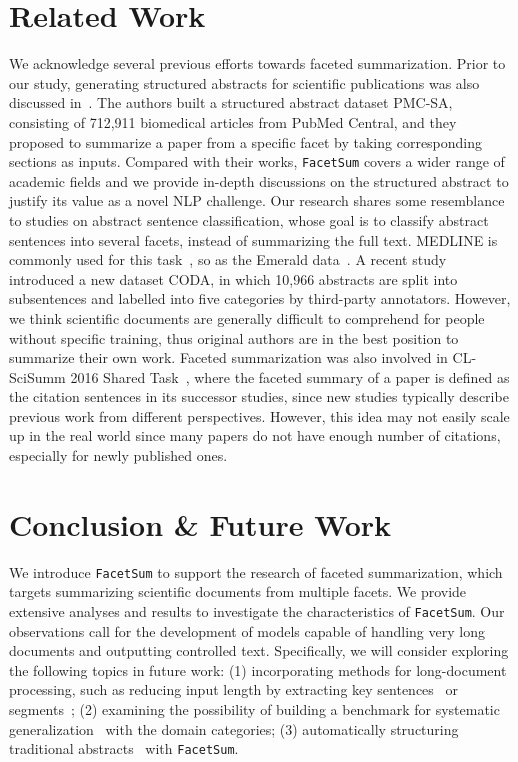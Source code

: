 \documentclass[11pt,a4paper]{article}
\newcommand{\ours}{\texttt{FacetSum}\xspace}
\begin{document}
\section{Related Work}
We acknowledge several previous efforts towards faceted summarization. Prior to our study, generating structured abstracts for scientific publications was also discussed in~\cite{gidiotis2019structured, gidiotis2020divide}. The authors built a structured abstract dataset PMC-SA, consisting of 712,911 biomedical articles from PubMed Central, and they proposed to summarize a paper from a specific facet by taking corresponding sections as inputs. Compared with their works, \ours covers a wider range of academic fields and we provide in-depth discussions on the structured abstract to justify its value as a novel NLP challenge.
Our research shares some resemblance to studies on abstract sentence classification, whose goal is to classify abstract sentences into several facets, instead of summarizing the full text. MEDLINE is commonly used for this task~\cite{kim2011automatic}, so as the Emerald data~\cite{stead2019emerald}. A recent study~\cite{huang2020coda} introduced a new dataset CODA, in which 10,966 abstracts are split into subsentences and labelled into five categories by third-party annotators. However, we think scientific documents are generally difficult to comprehend for people without specific training, thus original authors are in the best position to summarize their own work. 
Faceted summarization was also involved in CL-SciSumm 2016 Shared Task~\cite{jaidka2018insights}, where the faceted summary of a paper is defined as the citation sentences in its successor studies, since new studies typically describe previous work from different perspectives. However, this idea may not easily scale up in the real world since many papers do not have enough number of citations, especially for newly published ones.

\section{Conclusion \& Future Work}
\label{section:discussion}
We introduce  \ours to support the research of faceted summarization, which targets summarizing scientific documents from multiple facets. We provide extensive analyses and results to investigate the characteristics of \ours.  Our observations call for the development of models capable of handling very long documents and outputting controlled text. Specifically, we will consider exploring the following topics in future work: (1) incorporating methods for long-document processing, such as reducing input length by extracting key sentences~\citep{pilault2020extractive} or segments~\cite{zhao2020seal}; (2) examining the possibility of building a benchmark for systematic generalization~\cite{bahdanau2018systematic} with the domain categories; (3) automatically structuring traditional abstracts~\cite{huang2020coda} with \ours.
\end{document}
